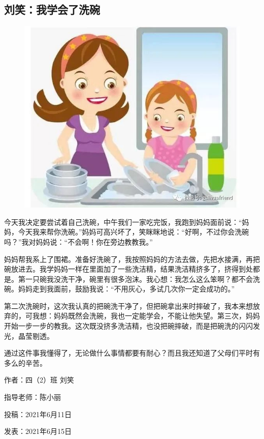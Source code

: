 \vspace{10pt}

{\centering\subsection*{刘笑：我学会了洗碗}}


\renewcommand{\leftmark}{刘笑：我学会了洗碗}

\begin{figure}[htbp]

\centering

\includegraphics[width = .5\textwidth]{./ch/4.jpg}

\end{figure}





今天我决定要尝试着自己洗碗，中午我们一家吃完饭，我跑到妈妈面前说：“妈妈，今天我来帮你洗碗。”妈妈可高兴坏了，笑眯眯地说：“好啊，不过你会洗碗吗？”我对妈妈说：“不会啊！你在旁边教教我。”

妈妈帮我系上了围裙。准备好洗碗了，我按照妈妈的方法去做，先把水接满，再把碗放进去。我学妈妈一样在里面加了一些洗洁精，结果洗洁精挤多了，挤得到处都是。第一只碗我没洗干净，碗里有很多泡沫。我心想：我怎么这么笨啊？都不会洗碗。妈妈走到我面前，鼓励我说：“不用灰心，多试几次你一定会成功的。”

第二次洗碗时，这次我认真的把碗洗干净了，但把碗拿出来时摔破了，我本来想放弃的，可我想：妈妈既然会洗碗，我也一定能学会，不能让他失望。第三次，妈妈开始一步一步的教我。这次既没挤多洗洁精，也没把碗摔破，而是把碗洗的闪闪发光，晶莹剔透。

通过这件事我懂得了，无论做什么事情都要有耐心？而且我还知道了父母们平时有多么的辛苦。





\vspace{10pt}



作者：四（2）班 刘笑



指导老师：陈小丽



投稿：2021年6月11日



发表：2021年6月15日






                



\vspace{10pt}

\hline




